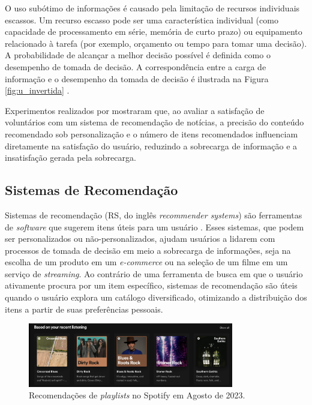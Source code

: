 O uso subótimo de informações é causado
pela limitação de recursos individuais escassos. Um recurso escasso pode ser uma
característica individual (como capacidade de processamento em série, memória de
curto prazo) ou equipamento relacionado à tarefa (por exemplo, orçamento ou
tempo para tomar uma decisão). A probabilidade de alcançar a melhor decisão
possível é definida como o desempenho de tomada de decisão. A correspondência
entre a carga de informação e o desempenho da tomada de decisão é ilustrada na
Figura \ref{fig:u_invertida} \cite{roetzel2019information}.

Experimentos realizados por \citet{liang2006personalized} mostraram que, ao
avaliar a satisfação de voluntários com um sistema de recomendação de notícias,
a precisão do conteúdo recomendado sob personalização e o número de itens
recomendados influenciam diretamente na satisfação do usuário, reduzindo a
sobrecarga de informação e a insatisfação gerada pela sobrecarga.

\subsection{Sistemas de Recomendação}

Sistemas de recomendação (RS, do inglês \textit{recommender systems}) são
ferramentas de \textit{software} que sugerem itens úteis para um usuário
\cite{ricci2010introduction}. Esses sistemas, que podem ser personalizados ou
não-personalizados, ajudam usuários a lidarem com processos de tomada de decisão
em meio a sobrecarga de informações, seja na escolha de um produto em um
\textit{e-commerce} ou na seleção de um filme em um serviço de
\textit{streaming}. Ao contrário de uma ferramenta de busca em que o usuário
ativamente procura por um item específico, sistemas de recomendação são úteis
quando o usuário explora um catálogo diversificado, otimizando a
distribuição dos itens a partir de suas preferências pessoais.

\begin{figure}[ht]
    \centering
    \includegraphics[width=0.8\textwidth]{chapters/chap01/images/spotify.png}
    \caption{Recomendações de \textit{playlists} no Spotify em Agosto de 2023.}
    \label{fig:spotify}
\end{figure}


